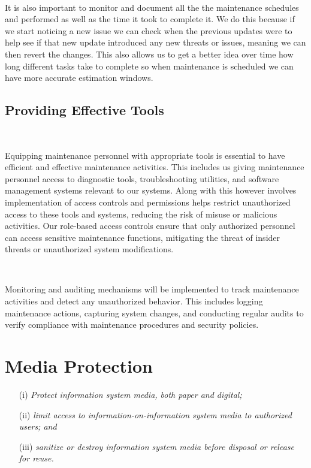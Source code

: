 \documentclass[12pt,a4paper]{report}
\begin{document}
\

It is also important to monitor and document all the the maintenance schedules and performed as well as the time it took to complete it.
We do this because if we start noticing a new issue we can check when the previous updates were to help see if that new update introduced any new threats or issues, meaning we can then revert the changes.
This also allows us to get a better idea over time how long different tasks take to complete so when maintenance is scheduled we can have more accurate estimation windows.

\section{Providing Effective Tools}
\

Equipping maintenance personnel with appropriate tools is essential to have efficient and effective maintenance activities.
This includes us giving maintenance personnel access to diagnostic tools, troubleshooting utilities, and software management systems relevant to our systems.
Along with this however involves implementation of access controls and permissions helps restrict unauthorized access to these tools and systems, reducing the risk of misuse or malicious activities. 
Our role-based access controls ensure that only authorized personnel can access sensitive maintenance functions, mitigating the threat of insider threats or unauthorized system modifications.

\

Monitoring and auditing mechanisms will be implemented to track maintenance activities and detect any unauthorized behavior. 
This includes logging maintenance actions, capturing system changes, and conducting regular audits to verify compliance with maintenance procedures and security policies.

\chapter{Media Protection}
\begin{enumerate}
 \item[(i)] \textit{Protect information system media, both paper and digital;}
 \item[(ii)] \textit{limit access to information-on-information system media to authorized users; and}
 \item[(iii)] \textit{sanitize or destroy information system media before disposal or release for reuse.}
\end{enumerate}
\end{document}
